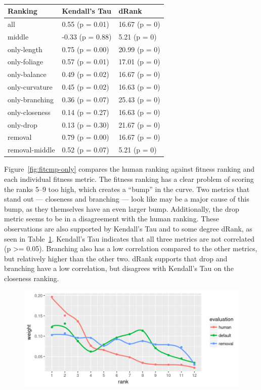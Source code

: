 \begin{table}
    \centering
    \begin{tabular}{| l | l | l |}
    \hline
    \textbf{Ranking} & \textbf{Kendall's Tau} & \textbf{dRank} \\
    \hline
                all & 0.55 (p = 0.01)  & 16.67 (p = 0) \\
             middle & -0.33 (p = 0.88) & 5.21 (p = 0) \\
        only-length & 0.75 (p = 0.00)  & 20.99 (p = 0) \\
       only-foliage & 0.57 (p = 0.01)  & 17.01 (p = 0) \\
       only-balance & 0.49 (p = 0.02)  & 16.67 (p = 0) \\
     only-curvature & 0.45 (p = 0.02)  & 16.63 (p = 0) \\
     only-branching & 0.36 (p = 0.07)  & 25.43 (p = 0) \\
     only-closeness & 0.14 (p = 0.27)  & 16.63 (p = 0) \\
          only-drop & 0.13 (p = 0.30)  & 21.67 (p = 0) \\
            removal & 0.79 (p = 0.00)  & 16.67 (p = 0) \\
     removal-middle & 0.52 (p = 0.07)  & 5.21 (p = 0) \\
    \hline
    \end{tabular}
    \caption{}
    \label{tab:rankstats}
\end{table}

Figure~\ref{fig:fitcmp-only} compares the human ranking against fitness ranking and each individual fitness metric.
The fitness ranking has a clear problem of scoring the ranks 5--9 too high, which creates a ``bump'' in the curve.
Two metrics that stand out --- closeness and branching --- look like may be a major cause of this bump, as they themselves have an even larger bump.
Additionally, the drop metric seems to be in a disagreement with the human ranking.
These observations are also supported by Kendall's Tau and to some degree dRank, as seen in Table~\ref{tab:rankstats}.
Kendall's Tau indicates that all three metrics are not correlated (p >= 0.05).
Branching also has a low correlation compared to the other metrics, but relatively higher than the other two.
dRank supports that drop and branching have a low correlation, but disagrees with Kendall's Tau on the closeness ranking.

\begin{figure}
    \centering
    \includegraphics[width=1.0\textwidth]{figures/fitcmp-removal}
    \caption{}
    \label{fig:fitcmp-removal}
\end{figure}

